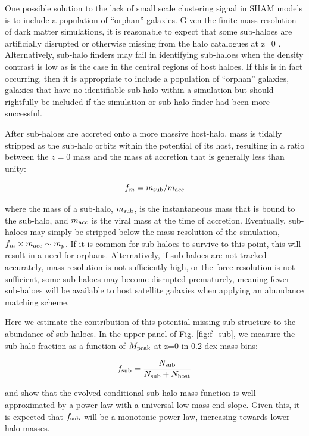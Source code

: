 \documentclass[a4paper,fleqn,usenatbib]{mnras}
\begin{document}
One possible solution to the lack of small scale clustering signal in SHAM models is to include a population of ``orphan'' galaxies.  Given the finite mass resolution of dark matter simulations, it is reasonable to expect that some sub-haloes are artificially disrupted or otherwise missing from the halo catalogues at z=0 \citep{Guo:2013fm}.  Alternatively, sub-halo finders may fail in identifying sub-haloes when the density contrast is low \citep{Wetzel:2010ei, Muldrew:2011gr, Knebe:2011jc, Onions:2012iv, Knebe:2013bp, vandenBosch:2016ky} as is the case in the central regions of host haloes.  If this is in fact occurring, then it is appropriate to include a population of ``orphan'' galaxies, galaxies that have no identifiable sub-halo within a simulation but should rightfully be included if the simulation or sub-halo finder had been more successful.       

After sub-haloes are accreted onto a more massive host-halo, mass is tidally stripped as the sub-halo orbits within the potential of its host, resulting in a ratio between the $z=0$ mass and the mass at accretion that is generally less than unity:
%
\begin{linenomath}
\begin{equation}
f_m = m_{\rm sub}/m_{\rm acc}
\end{equation}
\end{linenomath}
%
where the mass of a sub-halo, $m_{\rm sub}$, is the instantaneous mass that is bound to the sub-halo, and $m_{\rm acc}$ is the viral mass at the time of accretion.  Eventually, sub-haloes may simply be stripped below the mass resolution of the simulation, $f_m \times m_{\rm acc} \sim m_p$.  If it is common for sub-haloes to survive to this point, this will result in a need for orphans.  Alternatively, if sub-haloes are not tracked accurately, mass resolution is not sufficiently high, or the force resolution is not sufficient, some sub-haloes may become disrupted prematurely, meaning fewer sub-haloes will be available to host satellite galaxies when applying an abundance matching scheme.

Here we estimate the contribution of this potential missing sub-structure to the abundance of sub-haloes.  In the upper panel of Fig. \ref{fig:f_sub}, we measure the sub-halo fraction as a function of $M_{\rm peak}$ at z=0 in 0.2 dex mass bins:
%
\begin{linenomath}
\begin{equation}
\label{eq:fsub}
f_{\rm sub}= \frac{N_{\rm sub}}{N_{\rm sub}+N_{\rm host}}
\end{equation}
\end{linenomath}
%
\cite{Jiang:2016dw} and \cite{vandenBosch:2016ky} show that the evolved conditional sub-halo mass function is well approximated by a power law with a universal low mass end slope.  Given this, it is expected that $f_{\rm sub}$ will be a monotonic power law, increasing towards lower halo masses.
\end{document}
